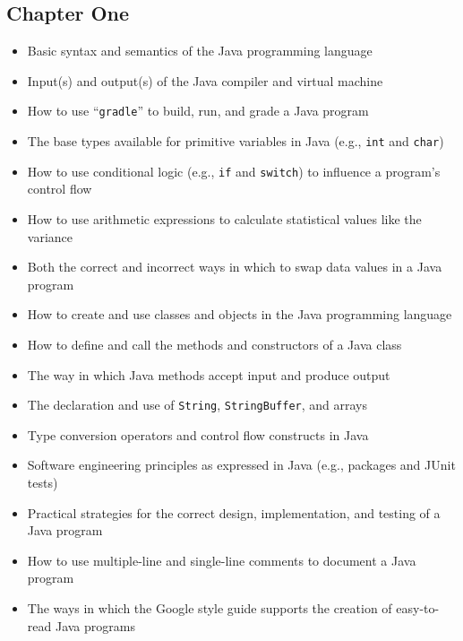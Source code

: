 \documentclass[11pt]{article}
\newcommand{\command}[1]{``\lstinline{#1}''}
\newcommand{\program}[1]{\lstinline{#1}}
\begin{document}
\vspace*{-.1in}

\subsection*{Chapter One}

\begin{itemize}

  \itemsep .05in

  \item Basic syntax and semantics of the Java programming language

  \item Input(s) and output(s) of the Java compiler and virtual machine

  \item How to use \command{gradle} to build, run, and grade a Java program

  \item The base types available for primitive variables in Java (e.g.,
    \program{int} and \program{char})

  \item How to use conditional logic (e.g., \program{if} and \program{switch})
    to influence a program's control flow

  \item How to use arithmetic expressions to calculate statistical values like
    the variance

  \item Both the correct and incorrect ways in which to swap data values in a
    Java program

  \item How to create and use classes and objects in the Java programming
    language

  \item How to define and call the methods and constructors of a Java class

  \item The way in which Java methods accept input and produce output

  \item The declaration and use of \program{String}, \program{StringBuffer}, and
    arrays

  \item Type conversion operators and control flow constructs in Java

  \item Software engineering principles as expressed in Java (e.g., packages and
    JUnit tests)

  \item Practical strategies for the correct design, implementation, and testing
    of a Java program

  \item How to use multiple-line and single-line comments to document a Java
    program

  \item The ways in which the Google style guide supports the creation of
    easy-to-read Java programs

\end{itemize}
\end{document}
